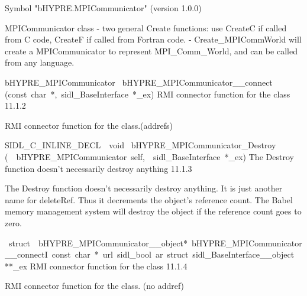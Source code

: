\documentclass{article}
\begin{document}
\begin{cxxentry}
\begin{cxxentry}
\begin{cxxvariable}
\begin{cxxdoc}
Symbol "bHYPRE.MPICommunicator" (version 1.0.0)

MPICommunicator class
- two general Create functions: use CreateC if called from C code,
CreateF if called from Fortran code.
- Create\_MPICommWorld will create a MPICommunicator to represent
MPI\_Comm\_World, and can be called from any language.
\end{cxxdoc}
\end{cxxvariable}
\begin{cxxfunction}
{bHYPRE\_MPICommunicator\ }
        {bHYPRE\_MPICommunicator\_\_connect}
        {(const\ char\ *,\ sidl\_BaseInterface\ *\_ex)}
        {
RMI connector function for the class}
        {11.1.2}
\begin{cxxdoc}

RMI connector function for the class.(addrefs)
\end{cxxdoc}
\end{cxxfunction}
\begin{cxxfunction}
{SIDL\_C\_INLINE\_DECL\ \ void\ }
        {bHYPRE\_MPICommunicator\_Destroy}
        {(\ \ bHYPRE\_MPICommunicator\ self,\ \ sidl\_BaseInterface\ *\_ex)}
        {
The Destroy function doesn't necessarily destroy anything}
        {11.1.3}
\begin{cxxdoc}

The Destroy function doesn't necessarily destroy anything.
It is just another name for deleteRef.  Thus it decrements the
object's reference count.  The Babel memory management system will
destroy the object if the reference count goes to zero.
\end{cxxdoc}
\end{cxxfunction}
\begin{cxxvariable}
{\ struct\ \ bHYPRE\_MPICommunicator\_\_object*\ bHYPRE\_MPICommunicator\_\_connectI\ const\ char\ *\ url\ sidl\_bool\ ar\ struct\ sidl\_BaseInterface\_\_object}
        {**\_ex}
        {}
        {
RMI connector function for the class}
        {11.1.4}
\begin{cxxdoc}

RMI connector function for the class. (no addref)
\end{cxxdoc}
\end{cxxvariable}
\end{cxxentry}
\end{cxxentry}
\end{document}

